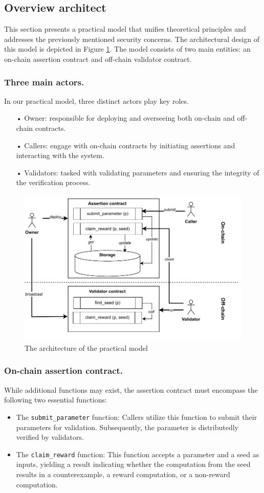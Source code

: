 \documentclass[runningheads]{llncs}
\begin{document}
\subsection{Overview architect}
This section presents a practical model that unifies theoretical principles and addresses the previously mentioned security concerns. The architectural design of this model is depicted in Figure \ref{fig.architect}. The model consists of two main entities: an on-chain assertion contract and off-chain validator contract. 
\subsubsection{Three main actors.} In our practical model, three distinct actors play key roles.
\begin{itemize}
\item[•] Owner: responsible for deploying and overseeing both on-chain and off-chain contracts.
\item[•] Callers: engage with on-chain contracts by initiating assertions and interacting with the system.
\item[•] Validators: tasked with validating parameters and ensuring the integrity of the verification process.
\end{itemize}


\begin{figure}
\centering
\includegraphics[scale=.8]{assertion}
\caption{The architecture of the practical model}
\label{fig.architect}
\end{figure}
\subsubsection{On-chain assertion contract.}
While additional functions may exist, the assertion contract must encompass the following two essential functions:
\begin{itemize}
\item The \lstinline|submit_parameter| function: Callers utilize this function to submit their parameters for validation. Subsequently, the parameter is distributedly verified by validators.
\item  The \lstinline|claim_reward| function: This function accepts a parameter and a seed as inputs, yielding a result indicating whether the computation from the seed results in a counterexample, a reward computation, or a non-reward computation.
\end{itemize}
\end{document}
